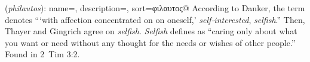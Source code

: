 \item[Selfishness,]

(\textit{philautos}):
{
    name=,
    description={},
    sort=φιλαυτος@
}
According to Danker, the term denotes ```with affection concentrated on on oneself,' \emph{self-interested}, \emph{selfish}.'' Then, Thayer and Gingrich agree on \emph{selfish}. \emph{Selfish} defines as ``caring only about what you want or need without any thought for the needs or wishes of other people.''
Found in 2~Tim 3:2.
